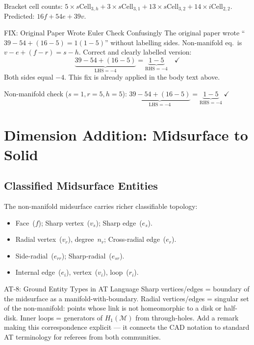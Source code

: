 \documentclass[journal,twocolumn,10pt]{IEEEtran}
\newcommand{\Hk}[1]{H_{#1}}
\newcommand{\sCell}[2]{s\text{Cell}_{#1,#2}}
\newcommand{\iCell}[2]{i\text{Cell}_{#1,#2}}
\begin{document}
Bracket cell counts:
$5{\times}\sCell{3}{h}+3{\times}\sCell{3}{1}
 +13{\times}\sCell{3}{2}+14{\times}\iCell{2}{2}$.
Predicted: $16f+54e+39v$.

\begin{fixblock}{FIX: Original Paper Wrote Euler Check Confusingly}
The original paper wrote ``$39-54+(16-5)=1(1-5)$'' without labelling sides.
Non-manifold eq.\ is $v-e+(f-r)=s-h$. Correct and clearly labelled version:
\[
  \underbrace{39-54+(16-5)}_{\text{LHS}=-4}
  =\underbrace{1-5}_{\text{RHS}=-4}\quad\checkmark
\]
Both sides equal $-4$. This fix is already applied in the body text above.
\end{fixblock}

Non-manifold check ($s{=}1,r{=}5,h{=}5$):
$\underbrace{39-54+(16-5)}_{\text{LHS}=-4}=\underbrace{1-5}_{\text{RHS}=-4}
\;\checkmark$

\section{Dimension Addition: Midsurface to Solid}\label{sec:midtosolid}

\subsection{Classified Midsurface Entities}\label{sec:entities}

The non-manifold midsurface carries richer classifiable topology:
\begin{itemize}[noitemsep,topsep=1pt,leftmargin=*,label=$\bullet$]
\item Face~($f$); Sharp vertex~($v_s$); Sharp edge~($e_s$).
\item Radial vertex~($v_r$), degree~$n_r$; Cross-radial edge~($e_r$).
\item Side-radial~($e_{rr}$); Sharp-radial~($e_{sr}$).
\item Internal edge~($e_i$), vertex~($v_i$), loop~($r_i$).
\end{itemize}

\begin{atblock}{AT-8: Ground Entity Types in AT Language}
Sharp vertices/edges = boundary of the midsurface as a manifold-with-boundary.
Radial vertices/edges = singular set of the non-manifold: points whose link
is not homeomorphic to a disk or half-disk.
Inner loops = generators of $\Hk{1}(\mathcal{M})$ from through-holes.
Add a remark making this correspondence explicit --- it connects the CAD
notation to standard AT terminology for referees from both communities.
\end{atblock}
\end{document}
